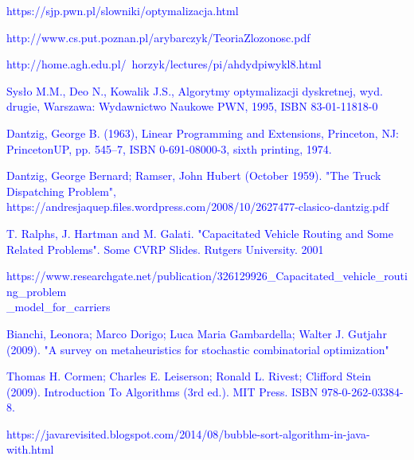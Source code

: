 \documentclass[a4paper, twoside, 12pt, justified]{article}
\begin{document}
	
	
	\newpage
	\renewcommand\refname{Źródła}
	\begin{thebibliography}{}
		{\hypertarget{optymalizacja}{\textcolor{blue}{
		https://sjp.pwn.pl/slowniki/optymalizacja.html}}}
	
		{\hypertarget{problemy}{\textcolor{blue}{
		http://www.cs.put.poznan.pl/arybarczyk/TeoriaZlozonosc.pdf}}}
	
		{\hypertarget{zlozonosc}{\textcolor{blue}{
		http://home.agh.edu.pl/~horzyk/lectures/pi/ahdydpiwykl8.html}}}

		{\hypertarget{komiwojazer}{\textcolor{blue}{
		Sysło M.M., Deo N., Kowalik J.S., Algorytmy optymalizacji dyskretnej, wyd. drugie, Warszawa: Wydawnictwo Naukowe PWN, 1995, ISBN 83-01-11818-0}}}
	
		{\hypertarget{dfj}{\textcolor{blue}{
		Dantzig, George B. (1963), Linear Programming and Extensions, Princeton, NJ: PrincetonUP, pp. 545–7, ISBN 0-691-08000-3, sixth printing, 1974.}}}
	
		{\hypertarget{vrp}{\textcolor{blue}{
		 Dantzig, George Bernard; Ramser, John Hubert (October 1959). "The Truck Dispatching Problem", https://andresjaquep.files.wordpress.com/2008/10/2627477-clasico-dantzig.pdf}}}
		
		{\hypertarget{cvrp}{\textcolor{blue}{T. Ralphs, J. Hartman and M. Galati. "Capacitated Vehicle Routing and Some Related Problems". Some CVRP Slides. Rutgers University. 2001}}}
		
		{\hypertarget{cvrp2}{\textcolor{blue}{https://www.researchgate.net/publication/326129926\_Capacitated\_vehicle\_routing\_problem\\\_model\_for\_carriers}}}
		
		{\hypertarget{metaheurystyka}{\textcolor{blue}{Bianchi, Leonora; Marco Dorigo; Luca Maria Gambardella; Walter J. Gutjahr (2009). "A survey on metaheuristics for stochastic combinatorial optimization"}}}
		
		{\hypertarget{algorithm}{\textcolor{blue}{
		Thomas H. Cormen; Charles E. Leiserson; Ronald L. Rivest; Clifford Stein (2009). Introduction To Algorithms (3rd ed.). MIT Press. ISBN 978-0-262-03384-8.}}}
	
		{\hypertarget{bubble}{\textcolor{blue}{
		https://javarevisited.blogspot.com/2014/08/bubble-sort-algorithm-in-java-with.html}}}
	

\end{thebibliography}
\end{document}
